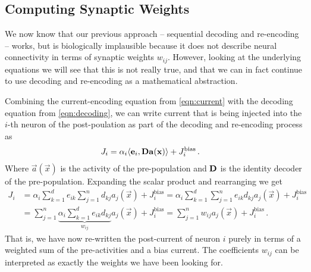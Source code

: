 \documentclass[10pt,letterpaper,oneside]{article}
\begin{document}

	\subsection{Computing Synaptic Weights}

	We now know that our previous approach -- sequential decoding and re-encoding -- works, but is biologically implausible because it does not describe neural connectivity in terms of synaptic weights $w_{ij}$. However, looking at the underlying equations we will see that this is not really true, and that we can in fact continue to use decoding and re-encoding as a mathematical abstraction.

	Combining the current-encoding equation from \cref{eqn:current} with the decoding equation from \cref{eqn:decoding}, we can write current that is being injected into the $i$-th neuron of the post-poulation as part of the decoding and re-encoding process as
	\begin{align*}
		J_i &= \alpha_i \langle {\mathbf{e}}_i, {\mathbf{D}} {\mathbf{a}}({\mathbf{x}}) \rangle + J^\mathrm{bias}_i \,.
	\end{align*}
	Where $\vec a(\vec x)$ is the activity of the pre-population and ${\mathbf{D}}$ is the identity decoder of the pre-population. Expanding the scalar product and rearranging we get
	\begin{align*}
		J_i &= \alpha_i \sum_{k=1}^d e_{ik} \sum_{j=1}^n d_{kj} a_j(\vec x) + J^\mathrm{bias}_i
		     = \alpha_i \sum_{k=1}^d \sum_{j=1}^n e_{ik} d_{kj} a_j(\vec x) + J^\mathrm{bias}_i \\
		    &= \sum_{j=1}^n \underbrace{\alpha_i  \sum_{k=1}^d e_{ik} d_{kj}}_{w_{ij}} a_j(\vec x) + J^\mathrm{bias}_i
		     = \sum_{j=1}^n w_{ij} a_j(\vec x) + J^\mathrm{bias}_i \,.
	\end{align*}
	That is, we have now re-written the post-current of neuron $i$ purely in terms of a weighted sum of the pre-activities and a bias current. The coefficients $w_{ij}$ can be interpreted as exactly the weights we have been looking for.
\end{document}

